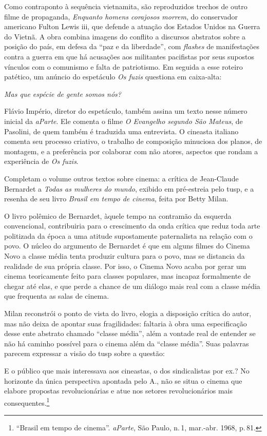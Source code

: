 Como contraponto à sequência vietnamita, são reproduzidos trechos de
outro filme de propaganda, {\it Enquanto homens corajosos morrem}, do
conservador americano Fulton Lewis {\sc iii}, que defende a atuação dos
Estados Unidos na Guerra do Vietnã. A obra combina imagens do conflito a
discursos abstratos sobre a posição do país, em defesa da “paz e da
liberdade”, com {\it flashes} de manifestações contra a guerra em que há
acusações aos militantes pacifistas por seus supostos vínculos com o
comunismo e falta de patriotismo. Em seguida a esse roteiro patético, um
anúncio do espetáculo {\it Os fuzis} questiona em caixa-alta:

{\it Mas que espécie de gente somos nós?}

Flávio Império, diretor do espetáculo, também assina um texto nesse
número inicial da {\it aParte}. Ele comenta o filme {\it O Evangelho
segundo São Mateus}, de Pasolini, de quem também é traduzida uma
entrevista. O cineasta italiano comenta seu processo criativo, o
trabalho de composição minuciosa dos planos, de montagem, e a
preferência por colaborar com não atores, aspectos que rondam a
experiência de {\it Os fuzis}.

Completam o volume outros textos sobre cinema: a crítica de Jean-Claude
Bernardet a {\it Todas as mulheres do mundo}, exibido em pré-estreia
pelo {\sc tusp}, e a resenha de seu livro {\it Brasil em tempo de cinema},
feita por Betty Milan.

O livro polêmico de Bernardet, àquele tempo na contramão da esquerda
convencional, contribuiria para o crescimento da onda crítica que reduz
toda arte politizada da época a uma atitude supostamente paternalista na
relação com o povo. O núcleo do argumento de Bernardet é que em alguns
filmes do Cinema Novo a classe média tenta produzir cultura para o povo,
mas se distancia da realidade de sua própria classe. Por isso, o Cinema
Novo acaba por gerar um cinema teoricamente feito para classes
populares, mas incapaz formalmente de chegar até elas, e que perde a
chance de um diálogo mais real com a classe média que frequenta as salas
de cinema.

Milan reconstrói o ponto de vista do livro, elogia a disposição crítica
do autor, mas não deixa de apontar suas fragilidades: faltaria à obra
uma especificação desse ente abstrato chamado “classe média”, além a
vontade real de entender se não há caminho possível para o cinema além
da “classe média”. Suas palavras parecem expressar a visão do {\sc tusp} sobre
a questão:

\startblockquote
E o público que mais interessava aos cineastas, o dos sindicalistas por
ex.? No horizonte da única perspectiva apontada pelo A., não se situa o
cinema que elabore propostas revolucionárias e atue nos setores
revolucionários mais consequentes.\footnote{“Brasil em tempo de cinema”.
  {\it aParte}, São Paulo, n.\,1, mar.-abr. 1968, p.\,81.}
\stopblockquote

